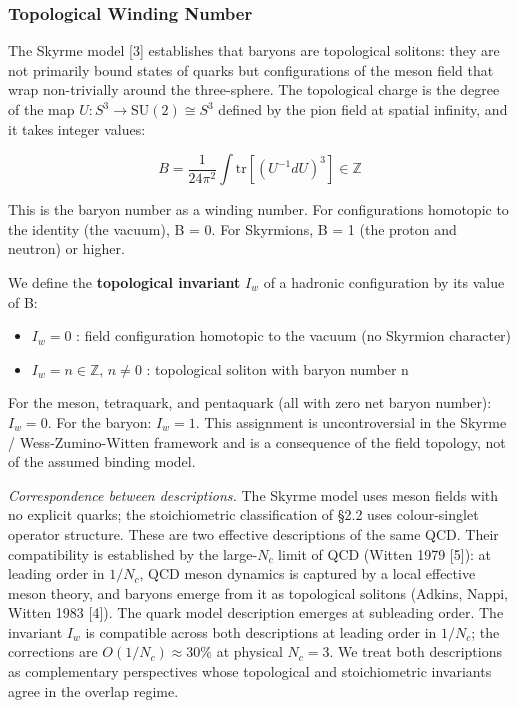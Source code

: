 \documentclass[12pt,a4paper]{article}
\begin{document}
\hypertarget{topological-winding-number}{%
\subsubsection{Topological Winding
Number}\label{topological-winding-number}}

The Skyrme model {[}3{]} establishes that baryons are topological
solitons: they are not primarily bound states of quarks but
configurations of the meson field that wrap non-trivially around the
three-sphere. The topological charge is the degree of the map
\(U : S^3 \to \mathrm{SU}(2) \cong S^3\) defined by the pion field at
spatial infinity, and it takes integer values:

\[B = \frac{1}{24\pi^2} \int \mathrm{tr}\left[ (U^{-1} dU)^3 \right] \in \mathbb{Z}\]

This is the baryon number as a winding number. For configurations
homotopic to the identity (the vacuum), B = 0. For Skyrmions, B = 1 (the
proton and neutron) or higher.

We define the \textbf{topological invariant} \(I_w\) of a hadronic
configuration by its value of B:

\begin{itemize}
\tightlist
\item
  \(I_w = 0\) : field configuration homotopic to the vacuum (no Skyrmion
  character)
\item
  \(I_w = n \in \mathbb{Z},\, n \neq 0\) : topological soliton with
  baryon number n
\end{itemize}

For the meson, tetraquark, and pentaquark (all with zero net baryon
number): \(I_w = 0\). For the baryon: \(I_w = 1\). This assignment is
uncontroversial in the Skyrme / Wess-Zumino-Witten framework and is a
consequence of the field topology, not of the assumed binding model.

\emph{Correspondence between descriptions.} The Skyrme model uses meson
fields with no explicit quarks; the stoichiometric classification of
§2.2 uses colour-singlet operator structure. These are two effective
descriptions of the same QCD. Their compatibility is established by the
large-\(N_c\) limit of QCD (Witten 1979 {[}5{]}): at leading order in
\(1/N_c\), QCD meson dynamics is captured by a local effective meson
theory, and baryons emerge from it as topological solitons (Adkins,
Nappi, Witten 1983 {[}4{]}). The quark model description emerges at
subleading order. The invariant \(I_w\) is compatible across both
descriptions at leading order in \(1/N_c\); the corrections are
\(O(1/N_c) \approx 30\%\) at physical \(N_c = 3\). We treat both
descriptions as complementary perspectives whose topological and
stoichiometric invariants agree in the overlap regime.
\end{document}
